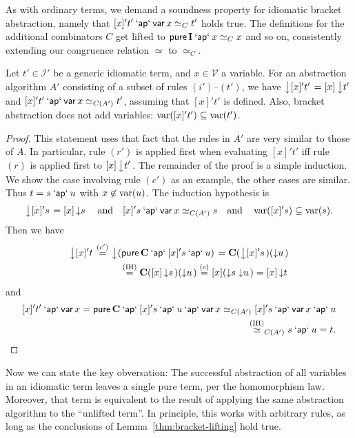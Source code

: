 As with ordinary terms, we demand a soundness property for idiomatic bracket
abstraction, namely that $[x]'t' \mathbin{\mathsf{`ap`}} \operatorname{\mathsf{var}} x \simeq_C t'$ holds true.
The definitions for the additional combinators $C$ get lifted to
$\operatorname{\mathsf{pure}} \mathbf{I} \mathbin{\mathsf{`ap`}} x \simeq_C x$ and so on, consistently extending our
congruence relation $\simeq$ to $\simeq_C$.

\begin{lemma}\label{thm:bracket-lifting}
Let $t' \in \mathcal{I'}$ be a generic idiomatic term, and $x \in \mathcal{V}$
a variable.
For an abstraction algorithm $A'$ consisting of a subset of rules $(i')$--$(t')$,
we have $\left\downarrow [x]'t'\right. = [x]\left\downarrow t'\right.$ and $[x]'t' \mathbin{\mathsf{`ap`}} \operatorname{\mathsf{var}} x \simeq_{C(A')} t'$,
assuming that $[x]'t'$ is defined.
Also, bracket abstraction does not add variables:
$\operatorname{var}([x]'t') \subseteq \operatorname{var}(t')$.
\end{lemma}
\begin{proof}
This statement uses that fact that the rules in $A'$ are very similar to those
of $A$.
In particular, rule $(r')$ is applied first when evaluating $[x]'t'$ iff rule
$(r)$ is applied first to $[x]\left\downarrow t'\right.$.
The remainder of the proof is a simple induction.
We show the case involving rule $(c')$ as an example, the other cases are similar.
Thus $t = s \mathbin{\mathsf{`ap`}} u$ with $x \not\in \operatorname{var}(u)$.
The induction hypothesis is
\[ \left\downarrow [x]'s\right. = [x]\left\downarrow s\right. \quad\text{and}\quad [x]'s \mathbin{\mathsf{`ap`}} \operatorname{\mathsf{var}} x \simeq_{C(A')} s
	\quad\text{and}\quad \operatorname{var}([x]'s) \subseteq \operatorname{var}(s). \]
Then we have
\[\begin{split}
	\left\downarrow [x]'t\right. \stackrel{(c')}{=} \left\downarrow (\operatorname{\mathsf{pure}} \mathbf{C} \mathbin{\mathsf{`ap`}} [x]'s \mathbin{\mathsf{`ap`}} u)\right.
	= \mathbf{C} (\left\downarrow [x]'s\right.) (\left\downarrow u\right.) \\
	\stackrel{\text{(IH)}}{=} \mathbf{C} ([x]\left\downarrow s\right.) (\left\downarrow u\right.)
	\stackrel{(c)}{=} [x](\left\downarrow s\right. \left\downarrow u\right.)
	= [x]\left\downarrow t\right. \end{split}\]
and
\[\begin{split} [x]'t' \mathbin{\mathsf{`ap`}} \operatorname{\mathsf{var}} x = \operatorname{\mathsf{pure}} \mathbf{C} \mathbin{\mathsf{`ap`}} [x]'s \mathbin{\mathsf{`ap`}} u \mathbin{\mathsf{`ap`}} \operatorname{\mathsf{var}} x
	\simeq_{C(A')} [x]'s \mathbin{\mathsf{`ap`}} \operatorname{\mathsf{var}} x \mathbin{\mathsf{`ap`}} u \\
	\stackrel{\text{(IH)}}{\simeq}_{C(A')} s \mathbin{\mathsf{`ap`}} u = t. \end{split}\]
\end{proof}

Now we can state the key obversation:
The successful abstraction of all variables in an idiomatic term leaves a
single pure term, per the homomorphism law.
Moreover, that term is equivalent to the result of applying the same abstraction
algorithm to the ``unlifted term''.
In principle, this works with arbitrary rules, as long as the conclusions of
Lemma~\ref{thm:bracket-lifting} hold true.

